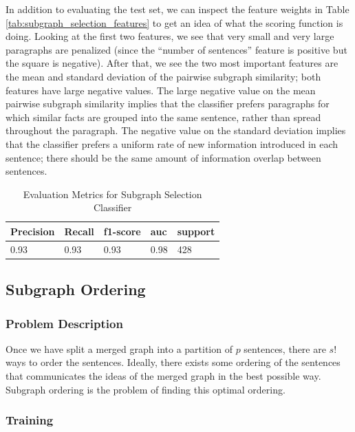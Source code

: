 \documentclass[12pt]{article}
\begin{document}
In addition to evaluating the test set, we can inspect the feature weights in Table \ref{tab:subgraph_selection_features} to get an idea of what the scoring function is doing. Looking at the first two features, we see that very small and very large paragraphs are penalized (since the ``number of sentences'' feature is positive but the square is negative). After that, we see the two most important features are the mean and standard deviation of the pairwise subgraph similarity; both features have large negative values. The large negative value on the mean pairwise subgraph similarity implies that the classifier prefers paragraphs for which similar facts are grouped into the same sentence, rather than spread throughout the paragraph. The negative value on the standard deviation implies that the classifier prefers a uniform rate of new information introduced in each sentence; there should be the same amount of information overlap between sentences.

\begin{table}[H]
\centering
\caption{Evaluation Metrics for Subgraph Selection Classifier}
\label{tab:subgraph_selection_eval}
\begin{tabular}{@{}lllll@{}}
\toprule
\textbf{Precision} & \textbf{Recall} & \textbf{f1-score} & \textbf{auc} & \textbf{support} \\ \midrule
0.93               & 0.93            & 0.93              & 0.98         & 428              \\ \bottomrule
\end{tabular}
\end{table}

\subsection{Subgraph Ordering}
\subsubsection{Problem Description}

Once we have split a merged graph into a partition of $p$ sentences, there are
$s!$ ways to order the sentences. Ideally, there exists some ordering of the
sentences that communicates the ideas of the merged graph in the best possible
way. Subgraph ordering is the problem of finding this optimal ordering.

\subsubsection{Training}
\end{document}
